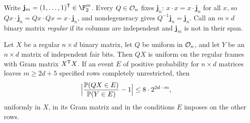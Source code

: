 Write $\mathbf j_m=(1,\dots,1)^{\spnT}\in\F_2^m$. Every $Q\in\mathcal{O}_n$ fixes $\mathbf j_n$:
$x\cdot x=x\cdot\mathbf j_n$ for all $x$, so $Qx\cdot\mathbf j_n=Qx\cdot Qx=x\cdot\mathbf j_n$,
and nondegeneracy gives $Q^{-1}\mathbf j_n=\mathbf j_n$. Call an $m\times d$ binary matrix
\emph{regular} if its columns are independent and $\mathbf j_m$ is not in their span.

\begin{lemma}\label{spn:lem:fibre}
Let $X$ be a regular $n\times d$ binary matrix, let $Q$ be uniform in $\mathcal{O}_n$, and let
$Y$ be an $n\times d$ matrix of independent fair bits. Then $QX$ is uniform on the regular
frames with Gram matrix $X^{\mathsf{T}}X$. If an event $E$ of positive probability for $n\times d$
matrices leaves $m\ge2d+5$ specified rows completely unrestricted, then
\[
 \Bigl|\frac{\mathbb{P}(QX\in E)}{\mathbb{P}(Y\in E)}-1\Bigr|\le8\cdot2^{2d-m},
\]
uniformly in $X$, in its Gram matrix and in the conditions $E$ imposes on the other rows.
\end{lemma}

